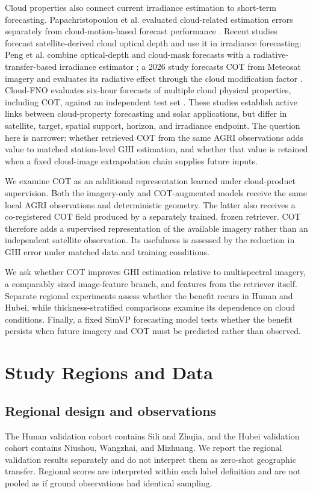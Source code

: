 \documentclass[11pt]{article}
\begin{document}
Cloud properties also connect current irradiance estimation to short-term forecasting. Papachristopoulou et al. evaluated cloud-related estimation errors separately from cloud-motion-based forecast performance \cite{pap2024}. Recent studies forecast satellite-derived cloud optical depth and use it in irradiance forecasting: Peng et al. combine optical-depth and cloud-mask forecasts with a radiative-transfer-based irradiance estimator \cite{peng2026}; a 2026 study forecasts COT from Meteosat imagery and evaluates its radiative effect through the cloud modification factor \cite{drosoglou2026}. Cloud-FNO evaluates six-hour forecasts of multiple cloud physical properties, including COT, against an independent test set \cite{zhang2026}. These studies establish active links between cloud-property forecasting and solar applications, but differ in satellite, target, spatial support, horizon, and irradiance endpoint. The question here is narrower: whether retrieved COT from the same AGRI observations adds value to matched station-level GHI estimation, and whether that value is retained when a fixed cloud-image extrapolation chain supplies future inputs.

We examine COT as an additional representation learned under cloud-product supervision. Both the imagery-only and COT-augmented models receive the same local AGRI observations and deterministic geometry. The latter also receives a co-registered COT field produced by a separately trained, frozen retriever. COT therefore adds a supervised representation of the available imagery rather than an independent satellite observation. Its usefulness is assessed by the reduction in GHI error under matched data and training conditions.

We ask whether COT improves GHI estimation relative to multispectral imagery, a comparably sized image-feature branch, and features from the retriever itself. Separate regional experiments assess whether the benefit recurs in Hunan and Hubei, while thickness-stratified comparisons examine its dependence on cloud conditions. Finally, a fixed SimVP forecasting model tests whether the benefit persists when future imagery and COT must be predicted rather than observed.

\section{Study Regions and Data}
\subsection{Regional design and observations}
The Hunan validation cohort contains Sili and Zhujia, and the Hubei validation cohort contains Niushou, Wangzhai, and Mizhuang. We report the regional validation results separately and do not interpret them as zero-shot geographic transfer. Regional scores are interpreted within each label definition and are not pooled as if ground observations had identical sampling.
\end{document}
